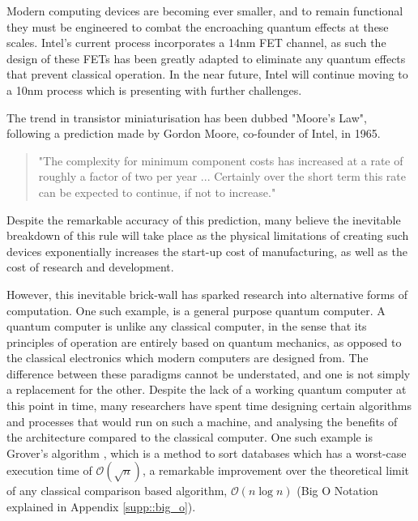 Modern computing devices are becoming ever smaller, and to remain functional they must be engineered to combat the encroaching quantum effects at these scales. Intel's current process incorporates a 14nm FET channel, as such the design of these FETs has been greatly adapted to eliminate any quantum effects that prevent classical operation. \cite{intel_process} In the near future, Intel will continue moving to a 10nm process which is presenting with further challenges. \cite{intel_future}

The trend in transistor miniaturisation has been dubbed "Moore's Law", following a prediction made by Gordon Moore, co-founder of Intel, in 1965. \cite{moore1965cramming}

\begin{quotation}
	"The complexity for minimum component costs has increased at a rate of roughly a factor of
	 two per year ... Certainly over the short term this rate
	can be expected to continue, if not to increase." 
\end{quotation}
Despite the remarkable accuracy of this prediction, many believe \cite{end_of_Moore_1, end_of_Moore_2} the inevitable breakdown of this rule will take place as the physical limitations of creating such devices exponentially increases the start-up cost of manufacturing, as well as the cost of research and development.

However, this inevitable brick-wall has sparked research into alternative forms of computation. One such example, is a general purpose quantum computer. A quantum computer is unlike any classical computer, in the sense that its principles of operation are entirely based on quantum mechanics, as opposed to the classical electronics which modern computers are designed from. The difference between these paradigms cannot be understated, and one is not simply a replacement for the other. Despite the lack of a working quantum computer at this point in time, many researchers have spent time designing certain algorithms and processes that would run on such a machine, and analysing the benefits of the architecture compared to the classical computer. One such example is Grover's algorithm \cite{grover1996fast}, which is a method to sort databases which has a worst-case execution time of $\mathcal{O}(\sqrt{n})$, a remarkable improvement over the theoretical limit of any classical comparison based algorithm, $\mathcal{O}(n \log{n})$ (Big O Notation explained in Appendix \ref{supp::big_o}). \\


